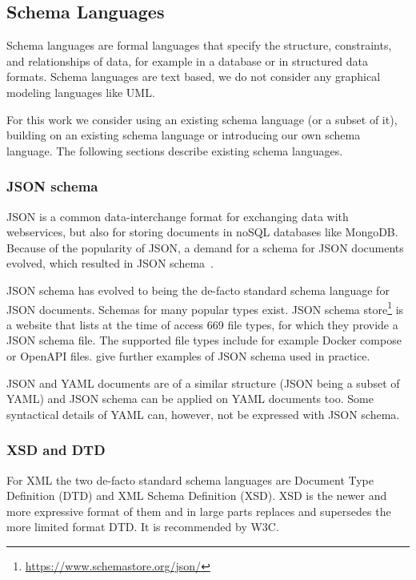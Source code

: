 
\subsection{Schema Languages}\label{subsec:schemalanguages}

Schema languages are formal languages that specify the structure, constraints, and relationships of data, for example in a database or in structured data formats.
Schema languages are text based, we do not consider any graphical modeling languages like UML.

For this work we consider using an existing schema language (or a subset of it), building on an existing schema language or introducing our own schema language.
The following sections describe existing schema languages.


\subsubsection{JSON schema}

JSON is a common data-interchange format for exchanging data with webservices, but also for storing documents in noSQL databases like MongoDB\@.
Because of the popularity of JSON, a demand for a schema for JSON documents evolved, which resulted in JSON schema~\cite{jsonSchema, jsonschemaJSONSchema}.

JSON schema has evolved to being the de-facto standard schema language for JSON documents. %
Schemas for many popular \cfgfile{} types exist. %
JSON schema store\footnote{\url{https://www.schemastore.org/json/}} is a website that lists at the time of access 669 file types, for which they provide a JSON schema file.
The supported file types include for example Docker compose or OpenAPI files.
\cite{barbaglia, ChaeronySiffa2022} give further examples of JSON schema used in practice.


JSON and YAML documents are of a similar structure (JSON being a subset of YAML) and JSON schema can be applied on YAML documents too.
Some syntactical details of YAML can, however, not be expressed with JSON schema. %

\subsubsection{XSD and DTD}
For XML the two de-facto standard schema languages are Document Type Definition (DTD)\cite{dtd_spec} and XML Schema Definition (XSD)\cite{xsd_spec}.
XSD is the newer and more expressive format of them and in large parts replaces and supersedes the more limited format DTD\cite{dtd_vs_xsd}.
It is recommended by W3C\cite{xsd_spec}.

